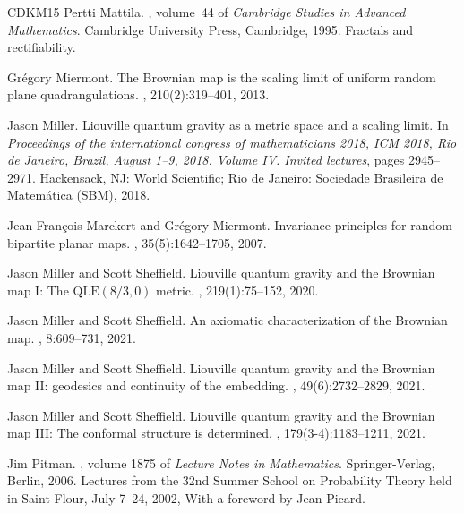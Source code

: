 \documentclass[british, a4paper,11pt]{article}
\numberwithin{equation}{section}
\theoremstyle{definition}
\begin{document}
{\begin{thebibliography}{CDKM15}
Pertti Mattila.
, volume~44
  of {\em Cambridge Studies in Advanced Mathematics}.
\newblock Cambridge University Press, Cambridge, 1995.
\newblock Fractals and rectifiability.

Gr{\'e}gory Miermont.
\newblock The {B}rownian map is the scaling limit of uniform random plane
  quadrangulations.
, 210(2):319--401, 2013.

Jason Miller.
\newblock Liouville quantum gravity as a metric space and a scaling limit.
\newblock In {\em Proceedings of the international congress of mathematicians
  2018, ICM 2018, Rio de Janeiro, Brazil, August 1--9, 2018. Volume IV. Invited
  lectures}, pages 2945--2971. Hackensack, NJ: World Scientific; Rio de
  Janeiro: Sociedade Brasileira de Matem{\'a}tica (SBM), 2018.

Jean-Fran{\c{c}}ois Marckert and Gr{\'e}gory Miermont.
\newblock Invariance principles for random bipartite planar maps.
, 35(5):1642--1705, 2007.

Jason Miller and Scott Sheffield.
\newblock Liouville quantum gravity and the {Brownian} map {I}: {The}
  {{\(\text{QLE}(8/3,0)\)}} metric.
, 219(1):75--152, 2020.

Jason Miller and Scott Sheffield.
\newblock An axiomatic characterization of the {Brownian} map.
, 8:609--731, 2021.

Jason Miller and Scott Sheffield.
\newblock Liouville quantum gravity and the {Brownian} map {II}: geodesics and
  continuity of the embedding.
, 49(6):2732--2829, 2021.

Jason Miller and Scott Sheffield.
\newblock Liouville quantum gravity and the {Brownian} map {III}: {The}
  conformal structure is determined.
, 179(3-4):1183--1211, 2021.

Jim Pitman.
, volume 1875 of {\em Lecture
  Notes in Mathematics}.
\newblock Springer-Verlag, Berlin, 2006.
\newblock Lectures from the 32nd Summer School on Probability Theory held in
  Saint-Flour, July 7--24, 2002, With a foreword by Jean Picard.


\end{thebibliography}}
\end{document}
